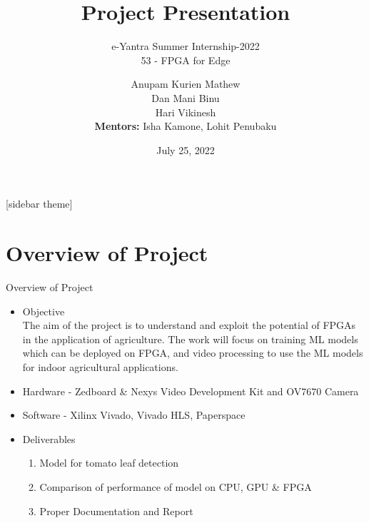 \documentclass[10pt, a4paper]{beamer}
\begin{document}
	\title{Project Presentation}
	\subtitle{e-Yantra Summer Internship-2022 \\ 53 - FPGA for Edge}
	\author{Anupam Kurien Mathew\\Dan Mani Binu\\Hari Vikinesh\\\vspace{0.3cm}\textbf{Mentors:} Isha Kamone, Lohit Penubaku}
	\date{July 25, 2022}
	\frame{\titlepage}

[sidebar theme]
\section{Overview of Project}
\begin{frame}{Overview of Project}
	\begin{itemize}
		\item Objective \\
				\justifying\hspace{7.5mm}The aim of the project is to understand and exploit the potential of FPGAs in the application of agriculture. The work will focus on training ML models which can be deployed on FPGA, and video processing to use the ML models for indoor agricultural applications.
		\item Hardware - Zedboard \& Nexys Video Development Kit and OV7670 Camera
		\item Software - Xilinx Vivado, Vivado HLS, Paperspace
		\item Deliverables \\
			\begin{enumerate}
				\item Model for tomato leaf detection
				\item Comparison of performance of model on CPU, GPU \& FPGA
				\item Proper Documentation and Report
			\end{enumerate}
	\end{itemize}
\end{frame}
\end{document}
